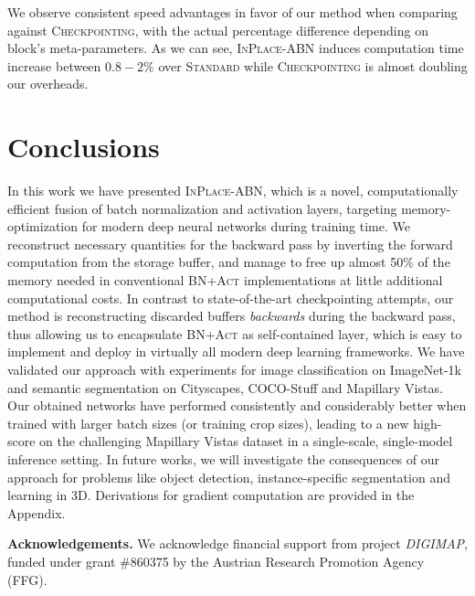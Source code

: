 \documentclass[10pt,twocolumn,letterpaper]{article}
\newcommand{\bnInplace}{\textsc{InPlace-ABN}\xspace}
\newcommand{\myparagraph}[1]{\vspace{5pt}\noindent\textbf{#1}}
\begin{document}
We observe consistent speed advantages in favor of our method when comparing against \textsc{Checkpointing}, with the actual percentage difference depending on block's meta-parameters. As we can see, \bnInplace induces computation time increase between $0.8-2\%$ over \textsc{Standard} while \textsc{Checkpointing} is almost doubling our overheads.


\section{Conclusions}
In this work we have presented \bnInplace, which is a novel, computationally efficient fusion of batch normalization and activation layers, targeting memory-optimization for modern deep neural networks during training time. We reconstruct necessary quantities for the backward pass by inverting the forward computation from the storage buffer, and manage to free up almost 50\% of the memory needed in conventional \textsc{BN+Act} implementations at little additional computational costs. In contrast to state-of-the-art checkpointing attempts, our method is reconstructing discarded buffers \textit{backwards} during the backward pass, thus allowing us to encapsulate \textsc{BN+Act} as self-contained layer, which is easy to implement and deploy in virtually all modern deep learning frameworks. We have validated our approach with experiments for image classification on ImageNet-1k and semantic segmentation on Cityscapes, COCO-Stuff and Mapillary Vistas. Our obtained networks have performed consistently and considerably better when trained with larger batch sizes (or training crop sizes), leading to a new high-score on the challenging Mapillary Vistas dataset in a single-scale, single-model inference setting. 
In future works, we will investigate the consequences of our approach for problems like object detection, instance-specific segmentation and learning in 3D. Derivations for gradient computation are provided in the Appendix.

\myparagraph{Acknowledgements.} We acknowledge financial support from project \textit{DIGIMAP}, funded under grant \#860375 by the Austrian Research Promotion Agency (FFG).
\end{document}
